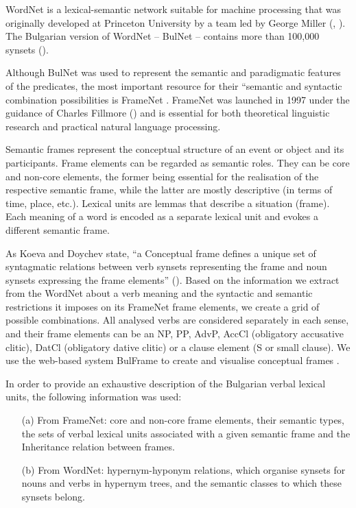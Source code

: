 \documentclass[output=paper,colorlinks,citecolor=brown]{langscibook}
\begin{document}
WordNet is a lexical-semantic network suitable for machine processing that was originally developed at Princeton University by a team led by George Miller (\cite{Miller1995}, \cite{Fellbaum1998}). The Bulgarian version of WordNet -- BulNet -- contains more than 100,000 synsets (\cite{koeva2021a}).

Although BulNet was used to represent the semantic and paradigmatic features of the predicates, the most important resource for their ``semantic and syntactic combination possibilities is FrameNet \citep[7]{Ruppenhofer2016}. FrameNet was launched in 1997 under the guidance of Charles Fillmore (\cite{Baker1998}) and is essential for both theoretical linguistic research and practical natural language processing.

Semantic frames represent the conceptual structure of an event or object and its participants.
Frame elements can be regarded as semantic roles. They can be core and non-core elements, the former being essential for the realisation of the respective semantic frame, while the latter are mostly descriptive (in terms of time, place, etc.). Lexical units are lemmas that describe a situation (frame). Each meaning of a word is encoded as a separate lexical unit and evokes a different semantic frame.

As Koeva and Doychev state, ``a Conceptual frame defines a unique set of syntagmatic relations between verb synsets representing the frame and noun synsets expressing the frame elements'' (\cite[203]{koeva-doychev-2022-ontology}). Based on the information we extract from the WordNet about a verb meaning and the syntactic and semantic restrictions it imposes on its FrameNet frame elements, we create a grid of possible combinations. All analysed verbs are considered separately in each sense, and their frame elements can be an NP, PP, AdvP, AccCl (obligatory accusative clitic), DatCl (obligatory dative clitic) or a clause element (S or small clause). We use the web-based system BulFrame to create and visualise conceptual frames \citep{koeva-doychev-2022-ontology}.
 
In order to provide an exhaustive description of the Bulgarian verbal lexical units, the following information was used:

\begin{itemize}
\item[(a)] From FrameNet: core and non-core frame elements, their semantic types, the sets of verbal lexical units associated with a given semantic frame and the Inheritance relation between frames.

\item[(b)] From WordNet: hypernym-hyponym relations, which organise synsets for nouns and verbs in hypernym trees, and the semantic classes to which these synsets belong.
 \end{itemize}
\end{document}
